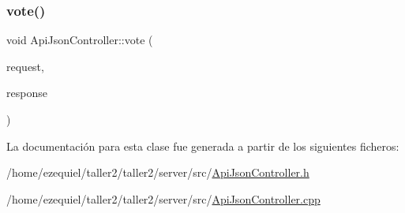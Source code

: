 \mbox{\label{classApiJsonController_a8c00cd6f8f88d05d1e1c80040bcdb1be}} 
\subsubsection{\texorpdfstring{vote()}{vote()}}
{\footnotesize\ttfamily void Api\+Json\+Controller\+::vote (\begin{DoxyParamCaption}\item[{Mongoose\+::\+Request \&}]{request,  }\item[{Mongoose\+::\+Json\+Response \&}]{response }\end{DoxyParamCaption})}



La documentación para esta clase fue generada a partir de los siguientes ficheros\+:\begin{DoxyCompactItemize}
\item 
/home/ezequiel/taller2/taller2/server/src/\hyperlink{ApiJsonController_8h}{Api\+Json\+Controller.\+h}\item 
/home/ezequiel/taller2/taller2/server/src/\hyperlink{ApiJsonController_8cpp}{Api\+Json\+Controller.\+cpp}\end{DoxyCompactItemize}
